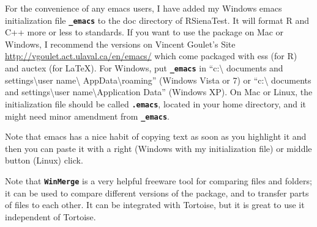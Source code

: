 \documentclass[12pt, a4paper]{article}
\renewcommand{\=}{\,=\,}
\newcommand{\+}{\,+\,}
\newcommand{\sfn}[1]{\textbf{\texttt{#1}}}
\begin{document}
For the convenience of any emacs users, I have added my Windows emacs
initialization file \sfn{\_emacs} to the doc directory of RSienaTest. It will
format R and C++ more or less to standards. If you want to use the package on
Mac or Windows, I recommend the versions on Vincent Goulet's Site
\url{http://vgoulet.act.ulaval.ca/en/emacs/} which come packaged with ess (for
R) and auctex (for \LaTeX). For Windows, put \sfn{\_emacs} in ``c:\textbackslash
documents and settings\textbackslash user name\textbackslash
AppData\textbackslash roaming'' (Windows Vista or 7) or ``c:\textbackslash
documents and settings\textbackslash user name\textbackslash Application Data''
(Windows XP). On Mac or Linux, the initialization file should be called
\sfn{.emacs}, located in your home directory, and it might need minor amendment
from \sfn{\_emacs}.

Note that emacs has a nice habit of copying text as soon as you highlight it and
then you can paste it with a right (Windows with my initialization file) or
middle button (Linux) click.

Note that \sfn{WinMerge} is a very helpful freeware tool for comparing files and folders;
it can be used to compare different versions of the package,
and to transfer parts of files to each other.
It can be integrated with Tortoise, but it is great to use it
independent of Tortoise.
\end{document}

